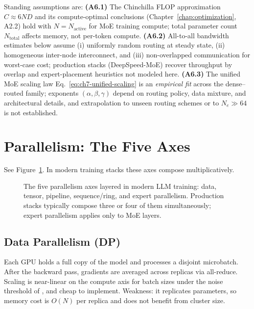 \begin{notationbox}
Standing assumptions are:
\textbf{(A6.1)} The Chinchilla FLOP approximation $C \approx 6 N D$
and its compute-optimal conclusions (Chapter~\ref{chap:optimization}, A2.2) hold with
$N = N_{\mathrm{active}}$ for MoE training compute; total parameter
count $N_{\mathrm{total}}$ affects memory, not per-token compute.
\textbf{(A6.2)} All-to-all bandwidth estimates below assume (i)
uniformly random routing at steady state, (ii) homogeneous
inter-node interconnect, and (iii) non-overlapped communication for
worst-case cost; production stacks (DeepSpeed-MoE) recover
throughput by overlap and expert-placement heuristics not modeled
here.
\textbf{(A6.3)} The unified MoE scaling law
Eq.~\eqref{eq:ch7-unified-scaling} is an \emph{empirical fit}
across the dense--routed family; exponents
$(\alpha, \beta, \gamma)$ depend on routing policy, data mixture,
and architectural details, and extrapolation to unseen routing
schemes or to $N_e \gg 64$ is not established.
\end{notationbox}

\section{Parallelism: The Five Axes}

See Figure~\ref{fig:week6-parallelism-axes}. In modern training
stacks these axes compose multiplicatively.

\begin{figure}[h]
\centering

\caption{The five parallelism axes layered in modern LLM training:
  data, tensor, pipeline, sequence/ring, and expert parallelism.
  Production stacks typically compose three or four of them
  simultaneously; expert parallelism applies only to MoE layers.}
\label{fig:week6-parallelism-axes}
\end{figure}

\subsection{Data Parallelism (DP)}

Each GPU holds a full copy of the model and processes a disjoint
microbatch. After the backward pass, gradients are averaged across
replicas via all-reduce. Scaling is near-linear on the compute axis
for batch sizes under the noise threshold of
\citet{mccandlish2018empirical}, and cheap to implement. Weakness: it
replicates parameters, so memory cost is $O(N)$ per replica and does
not benefit from cluster size.


